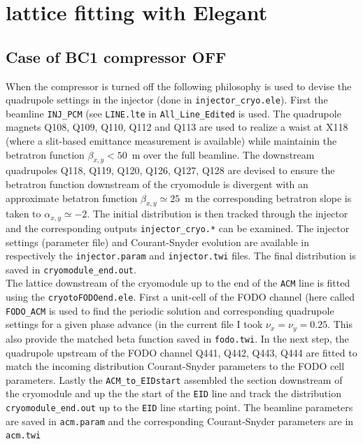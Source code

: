 \documentclass[notitlepage,twocolumn,nofootinbib,showpacs,preprintnumbers,superscriptaddress,amsmath,amssymb]{revtex4-1}
\begin{document}
\section{lattice fitting with Elegant}

\subsection{Case of BC1 compressor OFF}
When the compressor is turned off the following philosophy is used to devise the quadrupole settings in the injector (done in {\tt  injector\_cryo.ele}). First the beamline {\tt INJ\_PCM} (see {\tt LINE.lte} in {\tt All\_Line\_Edited} is used. The quadrupole magnets Q108, Q109, Q110, Q112 and Q113 are used to realize a waist at X118 (where a slit-based emittance measurement is available) while maintainin the betratron function  $\beta_{x,y}<50$~m over the full beamline. The downstream quadrupoles Q118, Q119, Q120, Q126, Q127, Q128 are devised to ensure the betratron function downstream of the cryomodule is divergent with an approximate betatron function $\beta_{x,y}\simeq 25$~m the corresponding betratron slope is taken to $\alpha_{x,y}\simeq -2$. The initial distribution is then tracked through the injector and the corresponding outputs {\tt  injector\_cryo.*} can be examined. The injector settings (parameter file) and Courant-Snyder evolution are available in respectively the {\tt injector.param} and {\tt injector.twi} files. The final distribution is saved in {\tt cryomodule\_end.out}.\\


The lattice downstream of the cryomodule up to the end of the {\tt ACM} line is fitted using the {\tt cryotoFODOend.ele}. First a unit-cell of the FODO channel (here called {\tt FODO\_ACM} is used to find the periodic solution and corresponding quadrupole settings for a given phase advance (in the current file I took $\nu_x=\nu_y=0.25$. This also provide the matched beta function saved in {\tt fodo.twi}. In the next step, the quadrupole upstream of the FODO channel
Q441, Q442, Q443, Q444 are fitted to match the incoming distribution Courant-Snyder parameters to the FODO cell parameters. Lastly the {\tt ACM\_to\_EIDstart} assembled the section downstream of the cryomodule and up the the start of the {\tt EID} line and track the distribution {\tt cryomodule\_end.out} up to the {\tt EID} line starting point. The beamline parameters are saved in {\tt acm.param} and the corresponding Courant-Snyder parameters are in {\tt acm.twi} 
\end{document}
